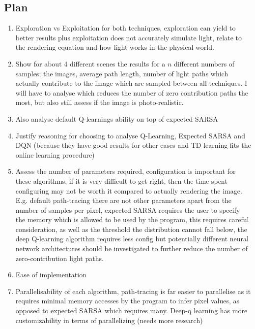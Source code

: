 \documentclass[ %
                    author={Callum Pearce},
                supervisor={Dr. Neill Campbell},
                    degree={MEng},
                     title={How effective are Temporal difference learning methods for reducing the number of zero contribution light paths while still accurately approximating Global Illumination in Path tracing?},
                  subtitle={},
                      type={research},
                      year={2019} ]{dissertation}
\begin{document}
\subsection{Plan}
\begin{enumerate}
\item Exploration vs Exploitation for both techniques, exploration can yield to better results plus exploitation does not accurately simulate light, relate to the rendering equation and how light works in the physical world.

\item Show for about 4 different scenes the results for a $n$ different numbers of samples; the images, average path length, number of light paths which actually contribute to the image which are sampled between all techniques. I will have to analyse which reduces the number of zero contribution paths the most, but also still assess if the image is photo-realistic.

\item Also analyse default Q-learnings ability on top of expected SARSA

\item Justify reasoning for choosing to analyse Q-Learning, Expected SARSA and DQN (because they have good results for other cases and TD learning fits the online learning procedure)

\item Assess the number of parameters required, configuration is important for these algorithms, if it is very difficult to get right, then the time spent configuring may not be worth it compared to actually rendering the image. E.g. default path-tracing there are not other parameters apart from the number of samples per pixel, expected SARSA requires the user to specify the memory which is allowed to be used by the program, this requires careful consideration, as well as the threshold the distribution cannot fall below, the deep Q-learning algorithm requires less config but potentially different neural network architectures should be investigated to further reduce the number of zero-contribution light paths. 

\item Ease of implementation 

\item Parallelisability of each algorithm, path-tracing is far easier to parallelise as it requires minimal memory accesses by the program to infer pixel values, as opposed to expected SARSA which requires many. Deep-q learning has more customizability in terms of parallelizing (needs more research)


\end{enumerate}
\end{document}
